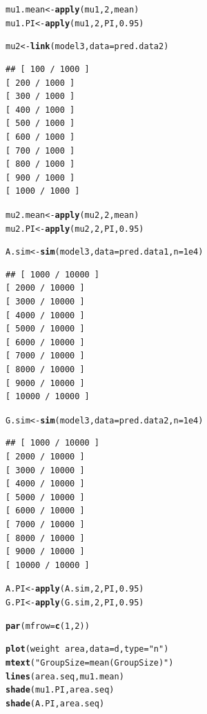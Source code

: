 \documentclass[12pt]{article}\usepackage[]{graphicx}\usepackage[]{color}
\makeatletter
\newcommand{\hlnum}[1]{\textcolor[rgb]{0.686,0.059,0.569}{#1}}%
\newcommand{\hlstr}[1]{\textcolor[rgb]{0.192,0.494,0.8}{#1}}%
\newcommand{\hlopt}[1]{\textcolor[rgb]{0,0,0}{#1}}%
\newcommand{\hlstd}[1]{\textcolor[rgb]{0.345,0.345,0.345}{#1}}%
\newcommand{\hlkwb}[1]{\textcolor[rgb]{0.69,0.353,0.396}{#1}}%
\newcommand{\hlkwc}[1]{\textcolor[rgb]{0.333,0.667,0.333}{#1}}%
\newcommand{\hlkwd}[1]{\textcolor[rgb]{0.737,0.353,0.396}{\textbf{#1}}}%
\newenvironment{kframe}{%
 \def\at@end@of@kframe{}%
 \ifinner\ifhmode%
  \def\at@end@of@kframe{\end{minipage}}%
  \begin{minipage}{\columnwidth}%
 \fi\fi%
 \def\FrameCommand##1{\hskip\@totalleftmargin \hskip-\fboxsep
 \colorbox{shadecolor}{##1}\hskip-\fboxsep
     \hskip-\linewidth \hskip-\@totalleftmargin \hskip\columnwidth}%
 \MakeFramed {\advance\hsize-\width
   \@totalleftmargin\z@ \linewidth\hsize
   \@setminipage}}%
 {\par\unskip\endMakeFramed%
 \at@end@of@kframe}
\newenvironment{knitrout}{}{} %
\makeatother
\begin{document}
\begin{knitrout}
\begin{kframe}
\begin{verbatim}
\end{verbatim}
\begin{alltt}
\hlstd{mu1.mean} \hlkwb{<-} \hlkwd{apply}\hlstd{(mu1,} \hlnum{2}\hlstd{, mean)}
\hlstd{mu1.PI} \hlkwb{<-} \hlkwd{apply}\hlstd{(mu1,} \hlnum{2}\hlstd{, PI,} \hlnum{0.95}\hlstd{)}

\hlstd{mu2} \hlkwb{<-} \hlkwd{link}\hlstd{(model3,} \hlkwc{data} \hlstd{= pred.data2)}
\end{alltt}
\begin{verbatim}
## [ 100 / 1000 ]
[ 200 / 1000 ]
[ 300 / 1000 ]
[ 400 / 1000 ]
[ 500 / 1000 ]
[ 600 / 1000 ]
[ 700 / 1000 ]
[ 800 / 1000 ]
[ 900 / 1000 ]
[ 1000 / 1000 ]

\end{verbatim}
\begin{alltt}
\hlstd{mu2.mean} \hlkwb{<-} \hlkwd{apply}\hlstd{(mu2,} \hlnum{2}\hlstd{, mean)}
\hlstd{mu2.PI} \hlkwb{<-} \hlkwd{apply}\hlstd{(mu2,} \hlnum{2}\hlstd{, PI,} \hlnum{0.95}\hlstd{)}

\hlstd{A.sim} \hlkwb{<-} \hlkwd{sim}\hlstd{(model3,} \hlkwc{data} \hlstd{= pred.data1,} \hlkwc{n} \hlstd{=} \hlnum{1e4}\hlstd{)}
\end{alltt}
\begin{verbatim}
## [ 1000 / 10000 ]
[ 2000 / 10000 ]
[ 3000 / 10000 ]
[ 4000 / 10000 ]
[ 5000 / 10000 ]
[ 6000 / 10000 ]
[ 7000 / 10000 ]
[ 8000 / 10000 ]
[ 9000 / 10000 ]
[ 10000 / 10000 ]

\end{verbatim}
\begin{alltt}
\hlstd{G.sim} \hlkwb{<-} \hlkwd{sim}\hlstd{(model3,} \hlkwc{data} \hlstd{= pred.data2,} \hlkwc{n} \hlstd{=} \hlnum{1e4}\hlstd{)}
\end{alltt}
\begin{verbatim}
## [ 1000 / 10000 ]
[ 2000 / 10000 ]
[ 3000 / 10000 ]
[ 4000 / 10000 ]
[ 5000 / 10000 ]
[ 6000 / 10000 ]
[ 7000 / 10000 ]
[ 8000 / 10000 ]
[ 9000 / 10000 ]
[ 10000 / 10000 ]

\end{verbatim}
\begin{alltt}
\hlstd{A.PI} \hlkwb{<-} \hlkwd{apply}\hlstd{(A.sim,} \hlnum{2}\hlstd{, PI,} \hlnum{0.95}\hlstd{)}
\hlstd{G.PI} \hlkwb{<-} \hlkwd{apply}\hlstd{(G.sim,} \hlnum{2}\hlstd{, PI,} \hlnum{0.95}\hlstd{)}

\hlkwd{par}\hlstd{(}\hlkwc{mfrow}\hlstd{=}\hlkwd{c}\hlstd{(}\hlnum{1}\hlstd{,}\hlnum{2}\hlstd{))}

\hlkwd{plot}\hlstd{(weight} \hlopt{~} \hlstd{area,} \hlkwc{data} \hlstd{= d,} \hlkwc{type} \hlstd{=} \hlstr{"n"}\hlstd{)}
\hlkwd{mtext}\hlstd{(}\hlstr{"Group Size = mean(Group Size)"}\hlstd{)}
\hlkwd{lines}\hlstd{(area.seq, mu1.mean)}
\hlkwd{shade}\hlstd{(mu1.PI, area.seq)}
\hlkwd{shade}\hlstd{(A.PI, area.seq)}


\end{alltt}
\end{kframe}
\end{knitrout}
\end{document}
